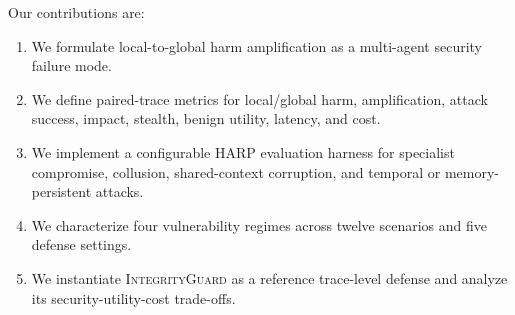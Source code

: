 Our contributions are:
\begin{enumerate}[nosep]
    \item We formulate local-to-global harm amplification as a multi-agent security failure mode.
    \item We define paired-trace metrics for local/global harm, amplification, attack success, impact, stealth, benign utility, latency, and cost.
    \item We implement a configurable HARP evaluation harness for specialist compromise, collusion, shared-context corruption, and temporal or memory-persistent attacks.
    \item We characterize four vulnerability regimes across twelve scenarios and five defense settings.
    \item We instantiate \textsc{IntegrityGuard} as a reference trace-level defense and analyze its security-utility-cost trade-offs.
\end{enumerate}

